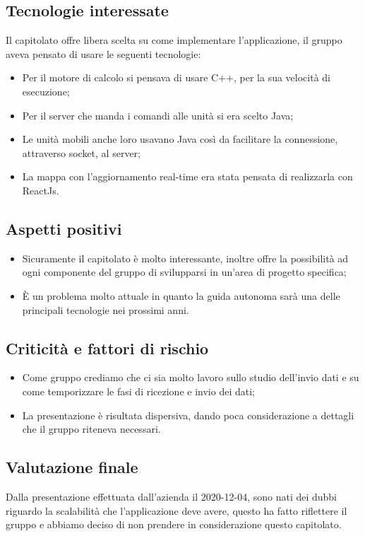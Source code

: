 \subsection{Tecnologie interessate}
Il capitolato offre libera scelta su come implementare l'applicazione, il gruppo aveva pensato di usare le seguenti tecnologie:
\begin{itemize}
\item Per il motore di calcolo si pensava di usare C++, per la sua velocità di esecuzione;
\item Per il server che manda i comandi alle unità si era scelto Java;
\item Le unità mobili anche loro usavano Java così da facilitare la connessione, attraverso socket, al server;
\item La mappa con l'aggiornamento real-time era stata pensata di realizzarla con ReactJs.
\end{itemize}

\subsection{Aspetti positivi}
\begin{itemize}
\item Sicuramente il capitolato è molto interessante, inoltre offre la possibilità ad ogni componente del gruppo di svilupparsi in un'area di progetto specifica;
\item È un problema molto attuale in quanto la guida autonoma sarà una delle principali tecnologie nei prossimi anni.
\end{itemize}

\subsection{Criticità e fattori di rischio}
\begin{itemize}
\item Come gruppo crediamo che ci sia molto lavoro sullo studio dell'invio dati e su come temporizzare le fasi di ricezione e invio dei dati;
\item La presentazione è risultata dispersiva, dando poca considerazione a dettagli che il gruppo riteneva necessari.  
\end{itemize}

\subsection{Valutazione finale}
Dalla presentazione effettuata dall'azienda il 2020-12-04, sono nati dei dubbi riguardo la scalabilità che l'applicazione deve avere, questo ha fatto riflettere il gruppo e abbiamo deciso di non prendere in considerazione questo capitolato.